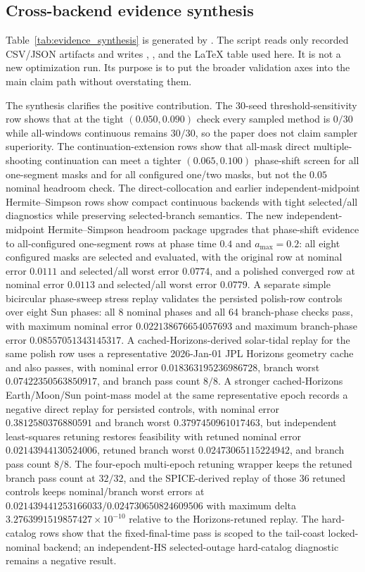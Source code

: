 \documentclass[preprint,12pt]{elsarticle}
\begin{document}
\subsection{Cross-backend evidence synthesis}

Table~\ref{tab:evidence_synthesis} is generated by . The script reads only recorded CSV/JSON artifacts and writes , , and the LaTeX table used here. It is not a new optimization run. Its purpose is to put the broader validation axes into the main claim path without overstating them.

The synthesis clarifies the positive contribution. The 30-seed threshold-sensitivity row shows that at the tight $(0.050,0.090)$ check every sampled method is $0/30$ while all-windows continuous remains $30/30$, so the paper does not claim sampler superiority. The continuation-extension rows show that all-mask direct multiple-shooting continuation can meet a tighter $(0.065,0.100)$ phase-shift screen for all one-segment masks and for all configured one/two masks, but not the $0.05$ nominal headroom check. The direct-collocation and earlier independent-midpoint Hermite--Simpson rows show compact continuous backends with tight selected/all diagnostics while preserving selected-branch semantics. The new independent-midpoint Hermite--Simpson headroom package upgrades that phase-shift evidence to all-configured one-segment rows at phase time $0.4$ and $a_{\max}=0.2$: all eight configured masks are selected and evaluated, with the original row at nominal error $0.0111$ and selected/all worst error $0.0774$, and a polished converged row at nominal error $0.0113$ and selected/all worst error $0.0779$. A separate simple bicircular phase-sweep stress replay validates the persisted polish-row controls over eight Sun phases: all 8 nominal phases and all 64 branch-phase checks pass, with maximum nominal error $0.022138676654057693$ and maximum branch-phase error $0.08557051343145317$. A cached-Horizons-derived solar-tidal replay for the same polish row uses a representative 2026-Jan-01 JPL Horizons geometry cache and also passes, with nominal error $0.018363195236986728$, branch worst $0.07422350563850917$, and branch pass count $8/8$. A stronger cached-Horizons Earth/Moon/Sun point-mass model at the same representative epoch records a negative direct replay for persisted controls, with nominal error $0.3812580376880591$ and branch worst $0.3797450961017463$, but independent least-squares retuning restores feasibility with retuned nominal error $0.02143944130524006$, retuned branch worst $0.02473065115224942$, and branch pass count $8/8$. The four-epoch multi-epoch retuning wrapper keeps the retuned branch pass count at $32/32$, and the SPICE-derived replay of those 36 retuned controls keeps nominal/branch worst errors at $0.021439441253166033/0.024730650824609506$ with maximum delta $3.2763991519857427\times10^{-10}$ relative to the Horizons-retuned replay. The hard-catalog rows show that the fixed-final-time pass is scoped to the tail-coast locked-nominal backend; an independent-HS selected-outage hard-catalog diagnostic remains a negative result.
\end{document}
